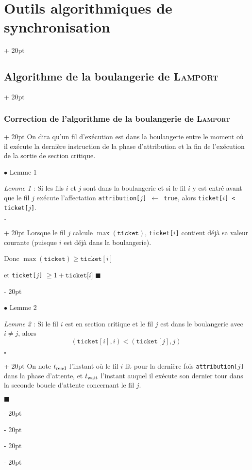 \documentclass[a4paper, 12pt, twoside]{article}
\renewcommand{\ge}{\geqslant}
\newcommand{\ind}[1][20pt]{\advance\leftskip + #1}
\newcommand{\deind}[1][20pt]{\advance\leftskip - #1}
\newenvironment{indt}[2][20pt]{#2 \par \ind[#1]}{\par \deind} %
\newenvironment{proof}[1][{}]{\begin{indt}{$\square$ #1}}{$\blacksquare$ \end{indt}}
\begin{document}
\begin{indt}{\section{Outils algorithmiques de synchronisation}}
\begin{indt}{\subsection{Algorithme de la boulangerie de \textsc{Lamport}}}
            \vspace{12pt}
            
            \begin{indt}{\subsubsection{Correction de l'algorithme de la boulangerie de \textsc{Lamport}}}
                On dira qu'un fil d'exécution est dans la boulangerie entre le moment où il exécute la dernière instruction de la phase d'attribution et la fin de l'exécution de la sortie de section critique.

                $\bullet$ Lemme 1

                \begin{emphBox}
                    \textit{Lemme 1} : Si les fils $i$ et $j$ sont dans la boulangerie et si le fil $i$ y est entré avant que le fil $j$ exécute l'affectation \texttt{attribution[$j$] $\leftarrow$ true}, alors \texttt{ticket[$i$] < ticket[$j$]}.
                \end{emphBox}

                \begin{proof}
                    Lorsque le fil $j$ calcule $\max(\mathtt{ticket})$, \texttt{ticket[$i$]} contient déjà sa valeur courante (puisque $i$ est déjà dans la boulangerie).

                    Donc $\max(\mathtt{ticket}) \ge \mathtt{ticket}[i]$

                    et \texttt{ticket[$j$]} $\ge 1 + \mathtt{ticket[} i \mathtt ]$
                \end{proof}

                \vspace{12pt}
                
                $\bullet$ Lemme 2

                \begin{emphBox}
                    \textit{Lemme 2} :
                    Si le fil $i$ est en section critique et le fil $j$ est dans le boulangerie avec $i \neq j$, alors
                    \[
                        (\mathtt{ticket}[i], i) < (\mathtt{ticket}[j], j)
                    \]
                \end{emphBox}

                \begin{proof}
                    On note $t_{\rm read}$ l'instant où le fil $i$ lit pour la dernière fois \texttt{attribution[$j$]} dans la phase d'attente, et $t_{\rm wait}$ l'instant auquel il exécute son dernier tour dans la seconde boucle d'attente concernant le fil $j$.


\end{proof}
\end{indt}
\end{indt}
\end{indt}
\end{document}
